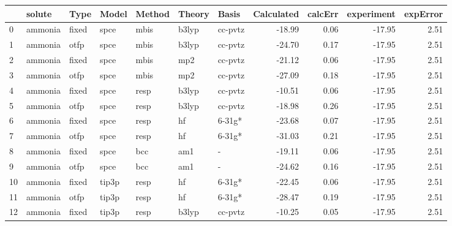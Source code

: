 \begin{tabular}{lllllllrrrr}
\toprule
{} &                        solute &   Type &  Model & Method &  Theory &        Basis &  Calculated &  calcErr &  experiment &  expError \\
\midrule
0   &                       ammonia &  fixed &   spce &   mbis &   b3lyp &      cc-pvtz &      -18.99 &     0.06 &      -17.95 &      2.51 \\
1   &                       ammonia &   otfp &   spce &   mbis &   b3lyp &      cc-pvtz &      -24.70 &     0.17 &      -17.95 &      2.51 \\
2   &                       ammonia &  fixed &   spce &   mbis &     mp2 &      cc-pvtz &      -21.12 &     0.06 &      -17.95 &      2.51 \\
3   &                       ammonia &   otfp &   spce &   mbis &     mp2 &      cc-pvtz &      -27.09 &     0.18 &      -17.95 &      2.51 \\
4   &                       ammonia &  fixed &   spce &   resp &   b3lyp &      cc-pvtz &      -10.51 &     0.06 &      -17.95 &      2.51 \\
5   &                       ammonia &   otfp &   spce &   resp &   b3lyp &      cc-pvtz &      -18.98 &     0.26 &      -17.95 &      2.51 \\
6   &                       ammonia &  fixed &   spce &   resp &      hf &       6-31g* &      -23.68 &     0.07 &      -17.95 &      2.51 \\
7   &                       ammonia &   otfp &   spce &   resp &      hf &       6-31g* &      -31.03 &     0.21 &      -17.95 &      2.51 \\
8   &                       ammonia &  fixed &   spce &    bcc &     am1 &            - &      -19.11 &     0.06 &      -17.95 &      2.51 \\
9   &                       ammonia &   otfp &   spce &    bcc &     am1 &            - &      -24.62 &     0.16 &      -17.95 &      2.51 \\
10  &                       ammonia &  fixed &  tip3p &   resp &      hf &       6-31g* &      -22.45 &     0.06 &      -17.95 &      2.51 \\
11  &                       ammonia &   otfp &  tip3p &   resp &      hf &       6-31g* &      -28.47 &     0.19 &      -17.95 &      2.51 \\
12  &                       ammonia &  fixed &  tip3p &   resp &   b3lyp &      cc-pvtz &      -10.25 &     0.05 &      -17.95 &      2.51 \\

\end{tabular}
